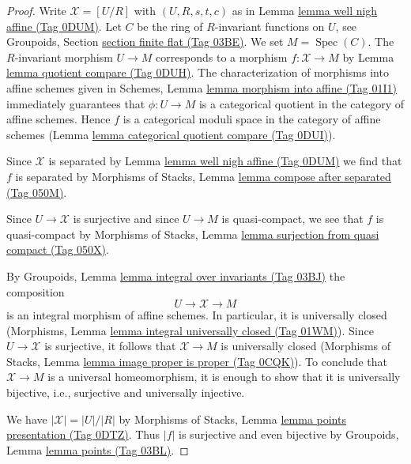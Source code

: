 \documentclass{amsart}
\theoremstyle{plain}
\theoremstyle{definition}
\theoremstyle{remark}
\numberwithin{equation}{subsection}
\def\Spec{\mathop{\mathrm{Spec}}}
\begin{document}
\begin{proof}
Write $\mathcal{X} = [U/R]$ with $(U, R, s, t, c)$ as in
Lemma \href{https://stacks.math.columbia.edu/tag/0DUM}{lemma well nigh affine (Tag 0DUM)}. Let $C$ be the ring of
$R$-invariant functions on $U$, see
Groupoids, Section \href{https://stacks.math.columbia.edu/tag/03BE}{section finite flat (Tag 03BE)}.
We set $M = \Spec(C)$. The $R$-invariant morphism
$U \to M$ corresponds to a morphism $f : \mathcal{X} \to M$ by
Lemma \href{https://stacks.math.columbia.edu/tag/0DUH}{lemma quotient compare (Tag 0DUH)}.
The characterization of morphisms into affine schemes given in
Schemes, Lemma \href{https://stacks.math.columbia.edu/tag/01I1}{lemma morphism into affine (Tag 01I1)}
immediately guarantees that $\phi : U \to M$ is a categorical
quotient in the category of affine schemes. Hence $f$ is a
categorical moduli space in the category of affine schemes
(Lemma \href{https://stacks.math.columbia.edu/tag/0DUI}{lemma categorical quotient compare (Tag 0DUI)}).

\medskip\noindent
Since $\mathcal{X}$ is separated by Lemma \href{https://stacks.math.columbia.edu/tag/0DUM}{lemma well nigh affine (Tag 0DUM)}
we find that $f$ is separated by Morphisms of Stacks, Lemma
\href{https://stacks.math.columbia.edu/tag/050M}{lemma compose after separated (Tag 050M)}.

\medskip\noindent
Since $U \to \mathcal{X}$ is surjective and since $U \to M$ is quasi-compact,
we see that $f$ is quasi-compact by Morphisms of Stacks, Lemma
\href{https://stacks.math.columbia.edu/tag/050X}{lemma surjection from quasi compact (Tag 050X)}.

\medskip\noindent
By Groupoids, Lemma \href{https://stacks.math.columbia.edu/tag/03BJ}{lemma integral over invariants (Tag 03BJ)}
the composition
$$
U \to \mathcal{X} \to M
$$
is an integral morphism of affine schemes. In particular, it is
universally closed
(Morphisms, Lemma \href{https://stacks.math.columbia.edu/tag/01WM}{lemma integral universally closed (Tag 01WM)}).
Since $U \to \mathcal{X}$ is surjective, it follows that $\mathcal{X} \to M$
is universally closed (Morphisms of Stacks, Lemma
\href{https://stacks.math.columbia.edu/tag/0CQK}{lemma image proper is proper (Tag 0CQK)}).
To conclude that $\mathcal{X} \to M$ is a universal homeomorphism,
it is enough to show that it is universally bijective, i.e.,
surjective and universally injective.

\medskip\noindent
We have $|\mathcal{X}| = |U|/|R|$ by
Morphisms of Stacks, Lemma \href{https://stacks.math.columbia.edu/tag/0DTZ}{lemma points presentation (Tag 0DTZ)}.
Thus $|f|$ is surjective and even bijective
by Groupoids, Lemma \href{https://stacks.math.columbia.edu/tag/03BL}{lemma points (Tag 03BL)}.


\end{proof}
\end{document}
